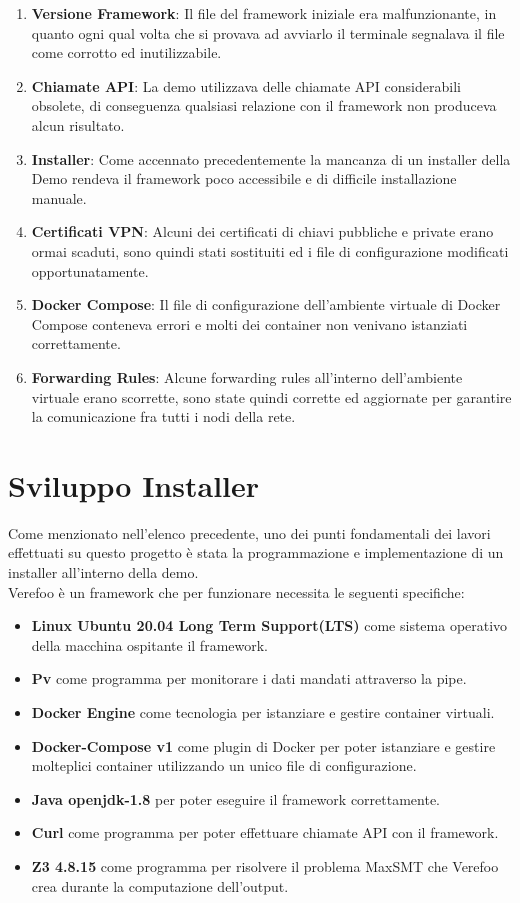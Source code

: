 \begin{enumerate}
    \item \textbf{Versione Framework}: Il file del framework iniziale era malfunzionante, in quanto ogni qual volta che si provava ad avviarlo il terminale segnalava il file come corrotto ed inutilizzabile.
    \item \textbf{Chiamate API}: La demo utilizzava delle chiamate API considerabili obsolete, di conseguenza qualsiasi relazione con il framework non produceva alcun risultato.
    \item \textbf{Installer}: Come accennato precedentemente la mancanza di un installer della Demo rendeva il framework poco accessibile e di difficile installazione manuale.
    \item \textbf{Certificati VPN}: Alcuni dei certificati di chiavi pubbliche e private erano ormai scaduti, sono quindi stati sostituiti ed i file di configurazione modificati opportunatamente.
    \item \textbf{Docker Compose}: Il file di configurazione dell'ambiente virtuale di Docker Compose conteneva errori e molti dei container non venivano istanziati correttamente.
    \item \textbf{Forwarding Rules}: Alcune forwarding rules all'interno dell'ambiente virtuale erano scorrette, sono state quindi corrette ed aggiornate per garantire la comunicazione fra tutti i nodi della rete.
\end{enumerate}

    
\section{Sviluppo Installer}
\label{sec:Installer}
Come menzionato nell'elenco precedente, uno dei punti fondamentali dei lavori effettuati su questo progetto è stata la programmazione e implementazione di un installer all'interno della demo.\\
Verefoo è un framework che per funzionare necessita le seguenti specifiche:
\begin{itemize}
    \item \textbf{Linux Ubuntu 20.04 Long Term Support(LTS)} come sistema operativo della macchina ospitante il framework.
    \item \textbf{Pv} come programma per monitorare i dati mandati attraverso la pipe.
    \item \textbf{Docker Engine} come tecnologia per istanziare e gestire container virtuali.
    \item \textbf{Docker-Compose v1} come plugin di Docker per poter istanziare e gestire molteplici container utilizzando un unico file di configurazione.
    \item  \textbf{Java openjdk-1.8} per poter eseguire il framework correttamente.
    \item \textbf{Curl} come programma per poter effettuare chiamate API con il framework.
    \item \textbf{Z3 4.8.15} come programma per risolvere il problema MaxSMT che Verefoo crea durante la computazione dell'output.
\end{itemize} 

